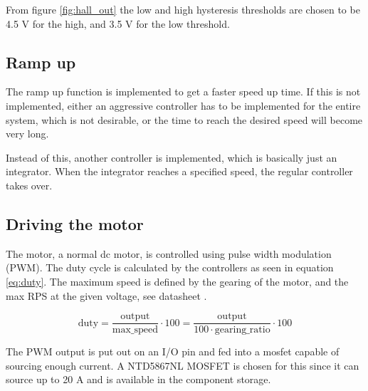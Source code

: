 From figure \ref{fig:hall_out} the low and high hysteresis thresholds are chosen to be 4.5 V for the high, and 3.5 V for the low threshold.

\subsection{Ramp up}

The ramp up function is implemented to get a faster speed up time.
If this is not implemented, either an aggressive controller has to be implemented for the entire system, which is not desirable, or the time to reach the desired speed will become very long.

Instead of this, another controller is implemented, which is basically just an integrator.
When the integrator reaches a specified speed, the regular controller takes over. 


\subsection{Driving the motor}

The motor, a normal dc motor, is controlled using pulse width modulation (PWM). The duty cycle is calculated by the controllers as seen in equation \ref{eq:duty}. The maximum speed is defined by the gearing of the motor, and the max RPS at the given voltage, see datasheet \cite{datasheet:motor}. 

\begin{equation}\label{eq:duty}
 \text{duty} = \frac{\text{output}}{\text{max\_speed}}\cdot 100 = \frac{\text{output}}{100\cdot \text{gearing\_ratio}}\cdot 100
\end{equation}

The PWM output is put out on an I/O pin and fed into a mosfet capable of sourcing enough current.
A NTD5867NL MOSFET is chosen for this since it can source up to 20 A\cite{datasheet:mosfet} and is available in the component storage.
